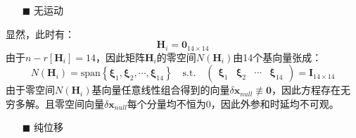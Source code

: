 \begin{itemize}
  \item[$\blacksquare$]无运动
\end{itemize}

显然，此时有：
\begin{equation}
  \boldsymbol{H}_i=\boldsymbol{0}_{14\times 14}
\end{equation}
由于$n-r\left[ \boldsymbol{H}_i\right] =14$，因此矩阵$\boldsymbol{H}_i$的零空间$N(\boldsymbol{H}_i)$由14个基向量张成：
\begin{equation}
  N(\boldsymbol{H}_i)=\mathrm{span}\left\lbrace
  \boldsymbol{\xi}_1,\boldsymbol{\xi}_2,\cdots,\boldsymbol{\xi}_{14}
  \right\rbrace
  \quad\mathrm{s.t.}\quad
  \begin{pmatrix}
    \boldsymbol{\xi}_1 & \boldsymbol{\xi}_2 & \cdots & \boldsymbol{\xi}_{14}
  \end{pmatrix}=\boldsymbol{I}_{14\times 14}
\end{equation}
由于零空间$N(\boldsymbol{H}_i)$基向量任意线性组合得到的向量$\delta\boldsymbol{x}_{null}\not\equiv\boldsymbol{0}$，因此方程存在无穷多解。且零空间向量$\delta\boldsymbol{x}_{null}$每个分量均不恒为0，因此外参和时延均不可观。
\begin{itemize}
  \item[$\blacksquare$]纯位移
\end{itemize}

